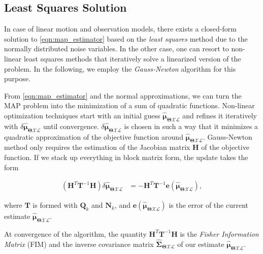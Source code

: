 \subsection{Least Squares Solution}
In case of linear motion and observation models, there exists a closed-form
solution to \eqref{eqn:map_estimator} based on the \emph{least squares} method
due to the normally distributed noise variables. In the other case, one can
resort to non-linear least squares methods that iteratively solve a linearized
version of the problem. In the following, we employ the \emph{Gauss-Newton}
algorithm for this purpose.

From \eqref{eqn:map_estimator} and the normal approximations, we can turn the
MAP problem into the minimization of a sum of quadratic functions. Non-linear
optimization techniques start with an initial guess
$\hat{\boldsymbol{\mu}}_{\boldsymbol{\Theta}\mathcal{X}\mathcal{L}}$ and refines
it iteratively with
$\delta\hat{\boldsymbol{\mu}}_{\boldsymbol{\Theta}\mathcal{X}\mathcal{L}}$ until
convergence.
$\delta\hat{\boldsymbol{\mu}}_{\boldsymbol{\Theta}\mathcal{X}\mathcal{L}}$ is
chosen in such a way that it minimizes a quadratic approximation of the
objective function around
$\hat{\boldsymbol{\mu}}_{\boldsymbol{\Theta}\mathcal{X}\mathcal{L}}$.
Gauss-Newton method only requires the estimation of the Jacobian matrix
$\mathbf{H}$ of the objective function. If we stack up everything in block
matrix form, the update takes the form

\begin{equation}\label{eqn:dx_update}
  \begin{aligned}
  (\mathbf{H}^T\mathbf{T}^{-1}\mathbf{H})
    \delta\hat{\boldsymbol{\mu}}_{\boldsymbol{\Theta}\mathcal{X}\mathcal{L}} &=
    -\mathbf{H}^T\mathbf{T}^{-1}\mathbf{e}(\mathbf{\hat{\boldsymbol{\mu}}_{
    \boldsymbol{\Theta}\mathcal{X}\mathcal{L}}}),
  \end{aligned}
\end{equation}

where $\mathbf{T}$ is formed with $\mathbf{Q}_k$ and $\mathbf{N}_k$, and
$\mathbf{e}(\mathbf{\hat{\boldsymbol{\mu}}_{
\boldsymbol{\Theta}\mathcal{X}\mathcal{L}}})$ is the error of the current
estimate $\hat{\boldsymbol{\mu}}_{\boldsymbol{\Theta}\mathcal{X}\mathcal{L}}$.

At convergence of the algorithm, the quantity
$\mathbf{H}^T\mathbf{T}^{-1}\mathbf{H}$ is the \emph{Fisher Information Matrix}
(FIM) and the inverse covariance matrix
$\hat{\boldsymbol{\Sigma}}_{\boldsymbol{\Theta}\mathcal{X}\mathcal{L}}$ of
our estimate
$\hat{\boldsymbol{\mu}}_{\boldsymbol{\Theta}\mathcal{X}\mathcal{L}}$.

